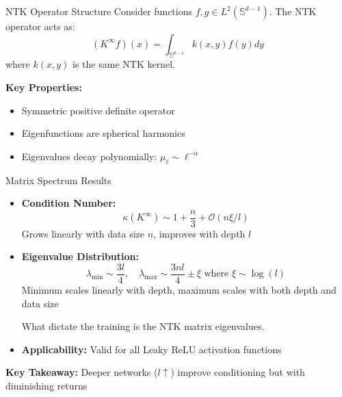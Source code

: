\documentclass{beamer}
\newcommand{\Kinf}{K^{\infty}}
\newcommand{\Sd}{\mathbb{S}^{d-1}}
\begin{document}
\begin{frame}{NTK Operator Structure}
Consider functions $f,g \in L^2(\Sd)$. The NTK operator acts as:
\[
(\Kinf f)(x) = \int_{\Sd} k(x,y)f(y)dy
\]
where $k(x,y)$ is the same NTK kernel.

\textbf{Key Properties:}
\begin{itemize}
\item Symmetric positive definite operator
\item Eigenfunctions are spherical harmonics
\item Eigenvalues decay polynomially: $\mu_\ell \sim \ell^{-\alpha}$
\end{itemize}
\end{frame}

\begin{frame}{Matrix Spectrum Results}
\begin{itemize}
\item \textbf{Condition Number:}
  \[ \kappa(K^{\infty}) \sim 1 + \frac{n}{3} + \mathcal{O}(n \xi / l) \]
  Grows linearly with data size $n$, improves with depth $l$

\item \textbf{Eigenvalue Distribution:}
  \[ \lambda_{\text{min}} \sim \frac{3l}{4}, \quad \lambda_{\text{max}} \sim \frac{3nl}{4} \pm \xi \text{ where } \xi \sim \log(l) \]
  Minimum scales linearly with depth, maximum scales with both depth and data size

What dictate the training is the NTK matrix eigenvalues.

\item \textbf{Applicability:} Valid for all Leaky ReLU activation functions
\end{itemize}

\textbf{Key Takeaway:} Deeper networks ($l \uparrow$) improve conditioning but with diminishing returns
\end{frame}
\end{document}
